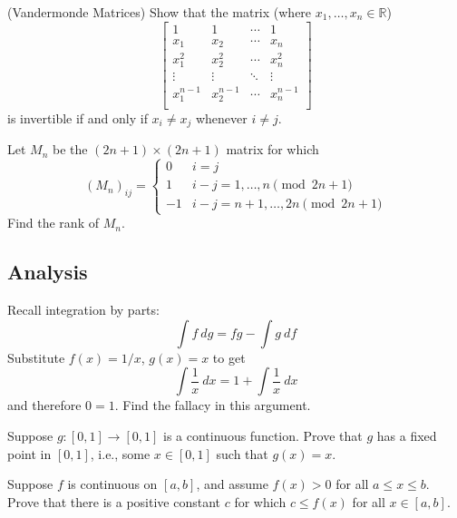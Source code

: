 \documentclass[12pt]{article}
\begin{document}
            \begin{exercise}
            (Vandermonde Matrices) Show that the matrix (where $x_{1}, \ldots, x_{n} \in \mathbb{R}$)
            \[\begin{bmatrix}
            1&1&\cdots&1\\
            x_{1}&x_{2}&\cdots&x_{n}\\
            x_{1}^{2}&x_{2}^{2}&\cdots&x_{n}^{2}\\
            \vdots&\vdots&\ddots&\vdots\\
            x_{1}^{n - 1}&x_{2}^{n - 1}&\cdots&x_{n}^{n - 1}\\
            \end{bmatrix}
            \]
            is invertible if and only if $x_{i} \neq x_{j}$ whenever $i \neq j$. 
            \end{exercise}

            \begin{exercise}
                Let $M_n$ be the $(2n+1)\times (2n+1)$ matrix for which \[(M_n)_{ij}=\begin{cases} 0 & i=j \\
                1 & i-j=1,\dots,n \pmod{2n+1} \\ -1 & i-j=n+1,\dots,2n \pmod{2n+1}\end{cases}\] Find the rank of $M_n$.
            \end{exercise}

    \subsection{Analysis}

        \begin{exercise}
            Recall integration by parts:
            \[ \int f\ dg = fg- \int g\ df\] Substitute $f(x)=1/x$, $g(x)=x$ to get
            \[\int \frac{1}{x}\ dx = 1+ \int \frac{1}{x}\ dx\] and therefore $0=1$. Find the fallacy in this argument.
        \end{exercise}

        \begin{exercise}
            Suppose $g:[0,1]\to [0,1]$ is a continuous function. Prove that $g$ has a fixed point in $[0,1]$, i.e., some $x\in [0,1]$ such that $g(x)=x$.
        \end{exercise}
            
        \begin{exercise}
            Suppose $f$ is continuous on $[a,b]$, and assume $f(x)>0$ for all $a\leq x \leq b$. Prove that there is a positive constant $c$ for which $c\leq f(x)$ for all $x\in [a,b]$.
        \end{exercise}
            
\end{document}
